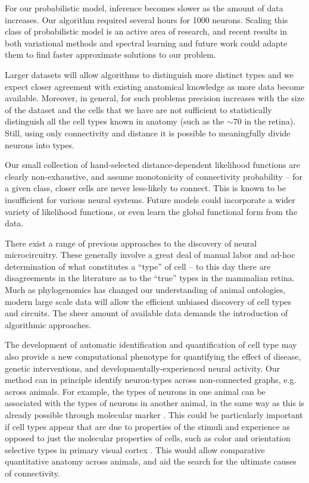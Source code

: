 \documentclass{article}
\begin{document}
For our probabilistic model, inference becomes slower as the amount of
data increases. Our algorithm required several hours for 1000
neurons. Scaling this class of probabilistic model is an active area
of research, and recent results in both variational methods
\autocite{Hoffman2013} and spectral learning \autocite{Anandkumar2012}
and future work could adapte them to find faster approximate solutions
to our problem.

Larger datasets will allow algorithms to distinguish more distinct
types and we expect closer agreement with existing anatomical
knowledge as more data become available.  Moreover, in general, for
such problems precision increases with the size of the dataset and the
cells that we have are not sufficient to statistically distinguish all
the cell types known in anatomy (such as the $\sim 70$ in the
retina). Still, using only connectivity and distance it is possible to
meaningfully divide neurons into types.

Our small collection of hand-selected distance-dependent likelihood
functions are clearly non-exhaustive, and assume monotonicity
of connectivity probability -- for a given class, closer cells
are never less-likely to connect. This is known to be insufficient
for various neural systems. Future models could incorporate
a wider variety of likelihood functions, or even learn the global
functional form from the data. 

There exist a range of previous approaches to the discovery of neural
microcircuitry\autocite{Mountcastle1957, Douglas1991, Bartho2004,
  Freund1998}.  These generally involve a great deal of manual labor
and ad-hoc determination of what constitutes a “type” of cell -- to
this day there are disagreements in the literature as to the “true”
types in the mammalian retina. Much as phylogenomics has changed our
understanding of animal ontologies, modern large scale data will allow
the efficient unbiased discovery of cell types and circuits. The sheer
amount of available data demands the introduction of algorithmic
approaches.

The development of automatic identification and quantification of cell
type may also provide a new computational phenotype for quantifying
the effect of disease, genetic interventions, and
developmentally-experienced neural activity. Our method can in
principle identify neuron-types across non-connected graphs,
e.g. across animals. For example, the types of neurons in one animal
can be associated with the types of neurons in another animal, in the
same way as this is already possible through molecular marker
\autocite{Brown2009}. This could be particularly important if cell
types appear that are due to properties of the stimuli and experience
as opposed to just the molecular properties of cells, such as color
and orientation selective types in primary visual cortex
\autocite{Sincich2005,Lennie2005}. This would allow comparative
quantitative anatomy across animals, and aid the search for the
ultimate causes of connectivity.
\end{document}
